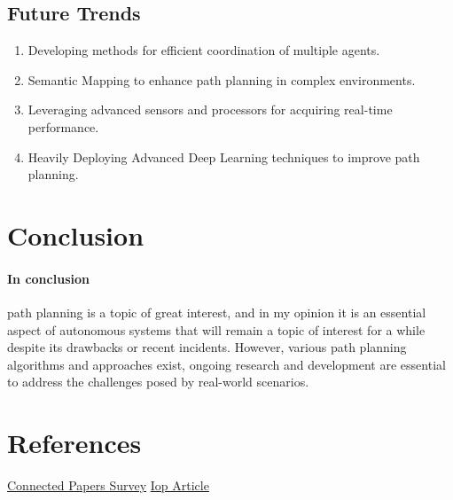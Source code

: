 \documentclass{article}
\begin{document}
\subsection{Future Trends}
\begin{enumerate}
	\item
Developing methods for efficient coordination of multiple agents.
	\item
Semantic Mapping to enhance path planning in complex environments.
	\item
Leveraging advanced sensors and processors for acquiring real-time performance.
	\item
Heavily Deploying Advanced Deep Learning techniques to improve path planning.
\end{enumerate}

\section{Conclusion}
\paragraph{In conclusion}
path planning is a topic of great interest, and in my opinion it is an essential aspect of autonomous systems that will remain a topic of interest for a while despite its drawbacks or recent incidents.
However, various path planning algorithms and approaches exist, ongoing research and development are essential to address the challenges posed by real-world scenarios.

\section{References}
\href{https://www.connectedpapers.com/main/9c07679d2da571ac6b9a051f229da4272817873d/A-Survey-of-Path-Planning-Algorithms-for-Mobile-Robots/graph}{Connected Papers Survey}
\newline
\href{https://iopscience.iop.org/article/10.1088/1755-1315/804/2/022024/meta}{Iop Article}
\end{document}
